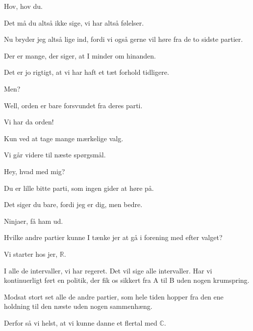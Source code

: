 \documentclass[a4paper,11pt]{article}
\begin{document}
\begin{sketch}
 Hov, hov du.

 Det må du altså ikke sige, vi har altså følelser.

 Nu bryder jeg altså lige ind, fordi vi også gerne vil høre fra de to sidste partier.

 Der er mange, der siger, at I minder om hinanden.

 Det er jo rigtigt, at vi har haft et tæt forhold tidligere.

 Men?

 Well, orden er bare forsvundet fra deres parti.

 Vi har da orden!

 Kun ved at tage mange mærkelige valg.


 Vi går videre til næste spørgsmål.

 Hey, hvad med mig?

 Du er lille bitte parti, som ingen gider at høre på.

 Det siger du bare, fordi jeg er dig, men bedre.

 Ninjaer, få ham ud.



 Hvilke andre partier kunne I tænke jer at gå i forening med efter valget?

 Vi starter hos jer, \ensuremath{\mathbb{R}}.

 I alle de intervaller, vi har regeret. Det vil sige alle intervaller. Har vi kontinuerligt ført en politik, der fik os sikkert fra A til B uden nogen krumspring.

 Modsat stort set alle de andre partier, som hele tiden hopper fra den ene holdning til den næste uden nogen sammenhæng.

 Derfor så vi helst, at vi kunne danne et flertal med \ensuremath{\mathbb{C}}.


\end{sketch}
\end{document}
